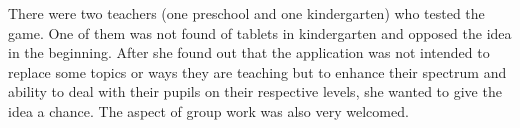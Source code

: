 There were two teachers (one preschool and one kindergarten) who tested the game.
One of them was not found of tablets in kindergarten and opposed the idea in the beginning.
After she found out that the application was not intended to replace some topics or ways they are teaching but
to enhance their spectrum and ability to deal with their pupils on their respective levels,
she wanted to give the idea a chance. The aspect of group work was also very welcomed.
